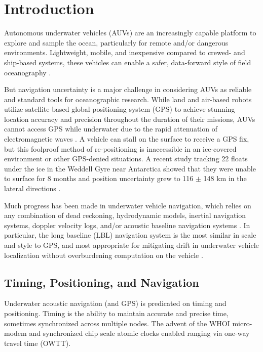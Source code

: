 \section{\label{sec:1} Introduction} 

Autonomous underwater vehicles (AUVs) are an increasingly capable platform to explore and sample the ocean, particularly for remote and/or dangerous environments.
Lightweight, mobile, and inexpensive compared to crewed- and ship-based systems, these vehicles can enable a safer, data-forward style of field oceanography \citep{bellingham_robotics_2007,petillot_underwater_2019}.

But navigation uncertainty is a major challenge in considering AUVs as reliable and standard tools for oceanographic research.
While land and air-based robots utilize satellite-based global positioning system (GPS) to achieve stunning location accuracy and precision throughout the duration of their missions, AUVs cannot access GPS while underwater due to the rapid attenuation of electromagnetic waves \citep{preisig_acoustic_2007}.
A vehicle can stall on the surface to receive a GPS fix, but this foolproof method of re-positioning is inaccessible in an ice-covered environment or other GPS-denied situations.
A recent study tracking 22 floats under the ice in the Weddell Gyre near Antarctica showed that they were unable to surface for 8 months and position uncertainty grew to 116 $\pm$ 148 km in the lateral directions \citep{chamberlain_observing_2018}.

Much progress has been made in underwater vehicle navigation, which relies on any combination of dead reckoning, hydrodynamic models, inertial navigation systems, doppler velocity logs, and/or acoustic baseline navigation systems \citep{paull_auv_2014}.
In particular, the long baseline (LBL) navigation system is the most similar in scale and style to GPS, and most appropriate for mitigating drift in underwater vehicle localization without overburdening computation on the vehicle \citep{van_uffelen_global_2021}.

\subsection{Timing, Positioning, and Navigation}

Underwater acoustic navigation (and GPS) is predicated on timing and positioning.
Timing is the ability to maintain accurate and precise time, sometimes synchronized across multiple nodes.
The advent of the WHOI micro-modem \citep{singh_underwater_2006} and synchronized chip scale atomic clocks \citep{gardner_second_2016} enabled ranging via one-way travel time (OWTT).

